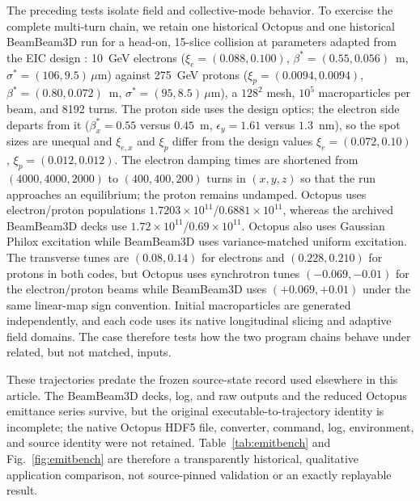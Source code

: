 \documentclass[a4paper,fleqn]{cas-sc}
\begin{document}
The preceding tests isolate field and collective-mode behavior.  To exercise
the complete multi-turn chain, we retain one historical Octopus and one
historical BeamBeam3D run for a head-on, 15-slice collision at parameters
adapted from the EIC design \citep{EICCDR2021}: 10~GeV electrons
($\xi_e=(0.088,0.100)$, $\beta^*=(0.55,0.056)$~m,
$\sigma^*=(106,9.5)\,\mu$m) against 275~GeV protons
($\xi_p=(0.0094,0.0094)$, $\beta^*=(0.80,0.072)$~m,
$\sigma^*=(95,8.5)\,\mu$m), a $128^2$ mesh, $10^5$ macroparticles per beam,
and 8192 turns.  The proton side uses the design optics; the electron side
departs from it ($\beta^*_x=0.55$ versus $0.45$~m, $\epsilon_y=1.61$ versus
$1.3$~nm), so the spot sizes are unequal and $\xi_{e,x}$ and $\xi_p$ differ
from the design values $\xi_e=(0.072,0.10)$, $\xi_p=(0.012,0.012)$.  The electron damping times are shortened from
$(4000,4000,2000)$ to $(400,400,200)$ turns in $(x,y,z)$ so that the run
approaches an equilibrium; the proton remains undamped.  Octopus uses
electron/proton populations $1.7203\times10^{11}$/$0.6881\times10^{11}$,
whereas the archived BeamBeam3D decks use
$1.72\times10^{11}$/$0.69\times10^{11}$.  Octopus also uses Gaussian Philox
excitation while BeamBeam3D uses variance-matched uniform excitation.  The
transverse tunes are $(0.08,0.14)$ for electrons and $(0.228,0.210)$ for
protons in both codes, but Octopus uses synchrotron tunes
$(-0.069,-0.01)$ for the electron/proton beams while BeamBeam3D uses
$(+0.069,+0.01)$ under the same linear-map sign convention.  Initial
macroparticles are generated independently, and each code uses its native
longitudinal slicing and adaptive field domains.  The case therefore tests
how the two program chains behave under related, but not matched, inputs.

These trajectories predate the frozen source-state record used elsewhere in
this article.  The BeamBeam3D decks, log, and raw outputs and the reduced
Octopus emittance series survive, but the original executable-to-trajectory
identity is incomplete; the native Octopus HDF5 file, converter, command, log,
environment, and source identity were not retained.  Table~\ref{tab:emitbench}
and Fig.~\ref{fig:emitbench} are therefore a transparently historical,
qualitative application comparison, not source-pinned validation or an exactly
replayable result.
\end{document}
